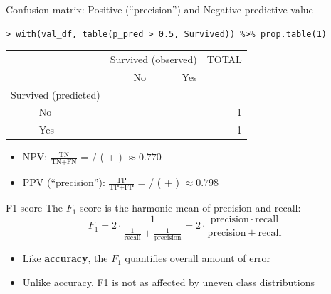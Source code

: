 \documentclass[xcolor=table,aspectratio=169]{beamer}
\begin{document}
\begin{frame}[fragile]
	{Confusion matrix: Positive (``precision'') and Negative predictive value}
	
	\begin{scriptsize}
		\begin{verbatim}
> with(val_df, table(p_pred > 0.5, Survived)) %>% prop.table(1)
\end{verbatim}
	\end{scriptsize}\bigskip
	
	\begin{tabular}[h]{llrrr}
		\toprule
		&    &\multicolumn{2}{c}{Survived (observed)} & TOTAL\\
		&   & No & Yes\\
		\midrule
		
		\multicolumn{2}{c}{Survived (predicted)}\\
		& No & \color{ForestGreen}{0.770} & \color{red}{0.230}  & 1\\
		& Yes & \color{red}{0.202} & \color{ForestGreen}{0.798} & 1\\
		\bottomrule
	\end{tabular}
	
	\bigskip
	\begin{itemize}
		\item NPV: $\frac{\text{TN}}{\text{TN} + \text{FN}}$ =
		{\color{ForestGreen}{134}} / ({\color{ForestGreen}{134}} +
		{\color{red}{40}}) $\approx 0.770$
		\item PPV (``precision''): $\frac{\text{TP}}{\text{TP} + \text{FP}}$
		= {\color{ForestGreen}{75}} / ({\color{ForestGreen}{75}} +
		{\color{red}{19}}) $\approx 0.798$    
	\end{itemize}
\end{frame}

\begin{frame}
	{F1 score}
	The $F_1$ score is the harmonic mean of precision and recall:
	$$
	F_1 = 2 \cdot \frac{1}{\tfrac{1}{\mathrm{recall}} + \tfrac{1}{\mathrm{precision}}} = 2 \cdot \frac{\mathrm{precision} \cdot \mathrm{recall}}{\mathrm{precision} + \mathrm{recall}}
	$$
	
	\bigskip
	
	\begin{itemize}
		\item Like \textbf{accuracy}, the $F_1$ quantifies overall amount of
		error
		\item Unlike accuracy, F1 is not as affected by uneven class distributions
	\end{itemize}
\end{frame}
\end{document}

